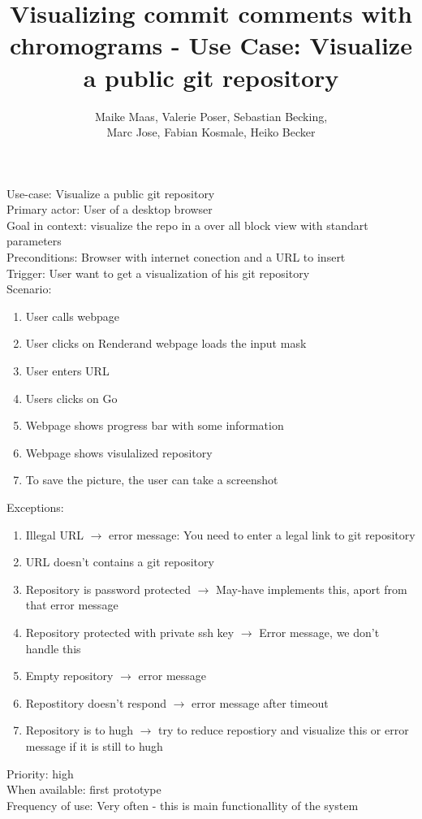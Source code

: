 \documentclass[11pt]{scrartcl}
\author{Maike Maas, Valerie Poser, Sebastian Becking,\\
Marc Jose, Fabian Kosmale, Heiko Becker}
\title{Visualizing commit comments with chromograms - Use Case: Visualize a public git repository}
\begin{document}
\maketitle


Use-case: Visualize a public git repository \\
Primary actor: User of a desktop browser \\
Goal in context: visualize the repo in a over all block view with standart parameters \\
Preconditions: Browser with internet conection and a URL to insert \\
Trigger: User want to get a visualization of his git repository \\

Scenario:
\begin{enumerate}
\item User calls webpage
\item User clicks on \glqq Render\grqq and webpage loads the input mask
\item User enters URL
\item Users clicks on \grqq Go\grqq
\item Webpage shows progress bar with some information
\item Webpage shows visulalized repository 
\item To save the picture, the user can take a screenshot
\end{enumerate}

Exceptions:
\begin{enumerate}
\item Illegal URL $\rightarrow$ error message: \glqq You need to enter a legal link to git repository\grqq
\item URL doesn't contains a git repository
\item Repository is password protected $\rightarrow$ May-have implements this, aport from that error message 
\item Repository protected with private ssh key $\rightarrow$ Error message, we don't handle this
\item Empty repository $\rightarrow$ error message
\item Repostitory doesn't respond $\rightarrow$ error message after timeout
\item Repository is to hugh $\rightarrow$  try to reduce repostiory and visualize this or error message if it is still to hugh
\end{enumerate}

Priority: high \\
When available: first prototype\\
Frequency of use: Very often - this is main functionallity of the system\\
\end{document}
